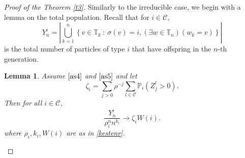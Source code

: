 \documentclass[12pt]{article}
\numberwithin{equation}{section}
\newtheorem{lemma}[theorem]{Lemma}
\begin{document}
\begin{proof}[Proof of the Theorem \ref{t3}]
    Similarly to the irreducible case, we begin with a lemma on the total population. Recall that for $i \in \mathcal{C}$,  \[
    Y^i_n = \left|\bigcup_{k =1}^{n}\left\{ v \in \mathbb{T}_k \ : \ \sigma(v) =i, (\exists w \in \mathbb{T}_n)(w_k = v) \right\}\right|
    \]
is the total number of particles of type $i$ that have offspring in the $n$-th generation.
\begin{lemma}\label{t3:lemmatotal}
    Assume $\eqref{as4}$ and $\eqref{as5}$ and let  \[\zeta_i =\sum_{j>0} \rho^{-j} \sum_{l \in \mathcal{C}}    \mathbb{P}_i\left(Z_j^l> 0\right).\] Then for all $i \in \mathcal{C}$,
    \[
    \frac{Y^i_n} {\rho_i^n n^{k_i}} \rightarrow \zeta_i W(i).
    \]
    where $\rho_i, k_i, W(i)$ are as in \eqref{kestenr}.
\end{lemma}


\end{proof}
\end{document}
